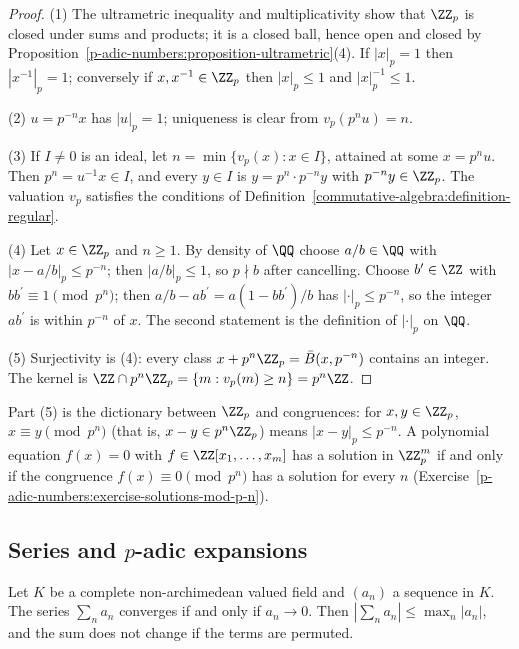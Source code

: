 \begin{proof}
(1) The ultrametric inequality and multiplicativity show that $\ZZ_p$ is closed under sums and products; it is a closed ball, hence open and closed by
Proposition~\ref{p-adic-numbers:proposition-ultrametric}(4). If $|x|_p = 1$ then $|x^{-1}|_p = 1$; conversely if $x, x^{-1} \in \ZZ_p$ then $|x|_p \leq 1$ and $|x|_p^{-1} \leq 1$.

(2) $u = p^{-n}x$ has $|u|_p = 1$; uniqueness is clear from $v_p(p^nu) = n$.

(3) If $I \neq 0$ is an ideal, let $n = \min\{v_p(x) : x \in I\}$, attained at some $x = p^nu$. Then $p^n = u^{-1}x \in I$, and every $y \in I$ is $y = p^n \cdot p^{-n}y$ with $p^{-n}y \in \ZZ_p$. The
valuation $v_p$ satisfies the conditions of Definition~\ref{commutative-algebra:definition-regular}.

(4) Let $x \in \ZZ_p$ and $n \geq 1$. By density of $\QQ$ choose $a/b \in \QQ$ with $|x - a/b|_p \leq p^{-n}$; then $|a/b|_p \leq 1$, so $p \nmid b$ after cancelling. Choose $b^{\prime} \in \ZZ$ with
$bb^{\prime} \equiv 1 \pmod{p^n}$; then $a/b - ab^{\prime} = a(1 - bb^{\prime})/b$ has $|\cdot|_p \leq p^{-n}$, so the integer $ab^{\prime}$ is within $p^{-n}$ of $x$. The second statement is the
definition of $|\cdot|_p$ on $\QQ$.

(5) Surjectivity is (4): every class $x + p^n\ZZ_p = \bar B(x, p^{-n})$ contains an integer. The kernel is $\ZZ \cap p^n\ZZ_p = \{m : v_p(m) \geq n\} = p^n\ZZ$.
\end{proof}

\begin{remark}\label{p-adic-numbers:remark-congruences}
Part (5) is the dictionary between $\ZZ_p$ and congruences: for $x, y \in \ZZ_p$, $x \equiv y \pmod{p^n}$ (that is, $x - y \in p^n\ZZ_p$) means $|x - y|_p \leq p^{-n}$. A polynomial equation
$f(x) = 0$ with $f \in \ZZ[x_1, \ldots, x_m]$ has a solution in $\ZZ_p^m$ if and only if the congruence $f(x) \equiv 0 \pmod{p^n}$ has a solution for every $n$
(Exercise~\ref{p-adic-numbers:exercise-solutions-mod-p-n}).
\end{remark}

\subsection{Series and $p$-adic expansions}\label{p-adic-numbers:subsection-expansions}

\begin{proposition}\label{p-adic-numbers:proposition-series}
Let $K$ be a complete non-archimedean valued field and $(a_n)$ a sequence in $K$. The series $\sum_na_n$ converges if and only if $a_n \to 0$. Then $|\sum_na_n| \leq \max_n|a_n|$, and the sum does not
change if the terms are permuted.
\end{proposition}

